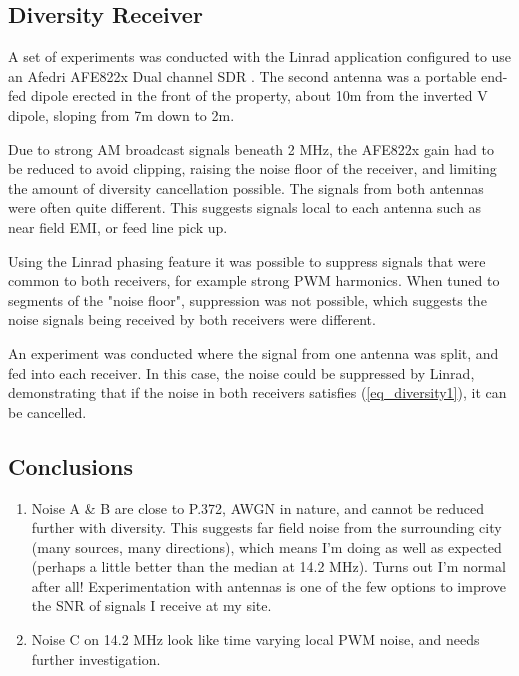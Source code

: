 \documentclass{article}
\begin{document}
\subsection{Diversity Receiver}

A set of experiments was conducted with the Linrad application \cite{linrad_home} configured to use an Afedri AFE822x Dual channel SDR \cite{afedri_dual}.  The second antenna was a portable end-fed dipole erected in the front of the property, about 10m from the inverted V dipole, sloping from 7m down to 2m.

Due to strong AM broadcast signals beneath 2 MHz, the AFE822x gain had to be reduced to avoid clipping, raising the noise floor of the receiver, and limiting the amount of diversity cancellation possible. The signals from both antennas were often quite different.  This suggests signals local to each antenna such as near field EMI, or feed line pick up.

Using the Linrad phasing feature \cite{linrad_phasing} it was possible to suppress signals that were common to both receivers, for example strong PWM harmonics.  When tuned to segments of the "noise floor", suppression was not possible, which suggests the noise signals being received by both receivers were different.

An experiment was conducted where the signal from one antenna was split, and fed into each receiver.  In this case, the noise could be suppressed by Linrad, demonstrating that if the noise in both receivers satisfies (\ref{eq_diversity1}), it can be cancelled.

\subsection{Conclusions}

\begin{enumerate}
\item Noise A \& B are close to P.372, AWGN in nature, and cannot be reduced further with diversity.  This suggests far field noise from the surrounding city (many sources, many directions), which means I'm doing as well as expected (perhaps a little better than the median at 14.2 MHz).  Turns out I'm normal after all!  Experimentation with antennas is one of the few options to improve the SNR of signals I receive at my site. 
\item Noise C on 14.2 MHz look like time varying local PWM noise, and needs further investigation.
\end{enumerate}
\end{document}
